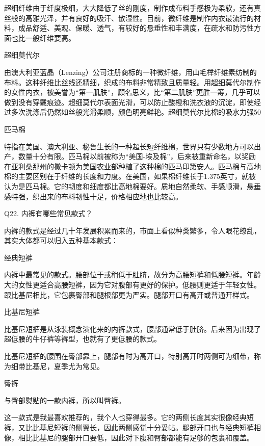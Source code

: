 \documentclass[12pt,UTF8]{ctexbook}
\begin{document}
超细纤维由于纤度极细，大大降低了丝的刚度，制作成布料手感极为柔软，还有真丝般的高雅光泽，并有良好的吸汗、散湿性。目前，微纤维是制作内衣最流行的材料，成品舒适、美观、保暖、透气，有较好的悬垂性和丰满度，在疏水和防污性方面也比一般纤维要高。

超细莫代尔

由澳大利亚蓝晶（Lenzing）公司注册商标的一种微纤维，用山毛榉纤维素纺制的布料。这种纤维比丝线还精细，织成的布料非常精致且质量轻。用超细莫代尔制作的女性内衣，被美誉为“第一肌肤”，顾名思义，比“第二肌肤”更胜一筹，几乎可以做到没有穿戴痕迹。超细莫代尔表面光滑，可以防止酸橙和洗衣液的沉淀，即使经过多次洗涤后仍然如丝般光滑柔顺，颜色明亮鲜艳。超细莫代尔比棉的吸水力强50%

匹马棉

特指在美国、澳大利亚、秘鲁生长的一种超长短纤维棉，世界只有少数地方可以出产，数量十分有限。匹马棉以前被称为“美国-埃及棉”，后来被重新命名，以奖励在亚利桑那州的撒卡顿为美国农业部种植了这种棉的匹马印第安人。匹马棉与高地棉的主要区别在于纤维的长度和力度。在美国，如果棉纤维长于1.375英寸，就被认为是匹马棉。它的韧度和细度都比高地棉要好。质地自然柔软、手感顺滑，悬垂感特强，织出来的布料韧性十足，价格相应地也比较高。





Q22. 内裤有哪些常见款式？


内裤的款式是经过几十年发展积累而来的，市面上看似种类繁多，令人眼花缭乱，其实大体都可以归入五种基本款式：



经典短裤



内裤中最常见的款式。腰部位于或稍低于肚脐，故分为高腰短裤和低腰短裤。年龄大的女性更适合高腰短裤，因为它对腹部有更好的保护。低腰则更适于年轻女性。跟比基尼相比，它包裹臀部和腿根部更为严实。腿部开口有高开或普通开样式。

比基尼短裤



比基尼短裤是从泳装概念演化来的内裤款式，腰部通常低于肚脐。后来因为出现了超低腰的牛仔裤等裤型，也就有了更低腰的款式。

比基尼短裤的腰围在臀部靠上，腿部有时为高开口，特别高开时两侧可为细带，称为细带比基尼，夏季尤为常见。

臀裤



与臀部熨贴的一款内裤，所以叫臀裤。

这一款式是我最喜欢推荐的，我个人也穿得最多。它的两侧长度其实很像经典短裤，又比比基尼短裤的侧翼长，因此两侧感觉十分妥帖。腿部开口也与经典短裤相像，相比比基尼的腿部开口要低，因此对下腹和臀部都能有足够的包裹和覆盖。
\end{document}
